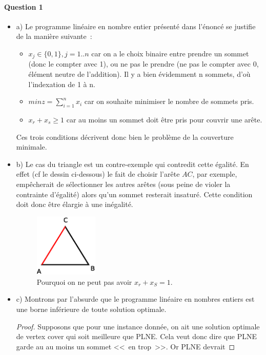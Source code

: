 \paragraph{Question 1}

\begin{itemize}
\item[] a) Le programme linéaire en nombre entier présenté dans
  l'énoncé se justifie de la manière suivante~:
\begin{itemize}
\item $x_j \in \{0,1\}, j=1..n$ car on a le choix binaire entre prendre un
  sommet (donc le compter avec 1), ou ne pas le prendre (ne pas le
  compter avec 0, élément neutre de l'addition). Il y a bien
  évidemment n sommets, d'où l'indexation de 1 à n.
\item $min z = \sum^n _{i=1} x_i$ car on souhaite minimiser le nombre
  de sommets pris.
\item $x_r + x_s \geq 1$ car au moins un sommet doit être pris pour
  couvrir une arête.
\end{itemize}
Ces trois conditions décrivent donc bien le problème de la couverture minimale.
\item[] b) Le cas du triangle est un contre-exemple qui contredit cette
égalité. En effet (cf le dessin ci-dessous) le fait de
choisir l'arête $AC$, par exemple, empêcherait de sélectionner les
autres arêtes (sous peine de violer la contrainte d'égalité) alors
qu'un sommet resterait insaturé. Cette condition doit donc être
élargie à une inégalité.
\begin{figure}[!ht]
\begin{center}
\includegraphics[height=3cm]{../images/triangle.eps}
\end{center}
\caption{Pourquoi on ne peut pas avoir $x_r + x_S = 1$.}
\end{figure}
\item[] c) Montrons par l'absurde que le programme linéaire en nombres
  entiers est une borne inférieure de toute solution optimale.
\begin{proof}
Supposons que pour une instance donnée, on ait une solution optimale
de vertex cover qui soit meilleure que PLNE. Cela veut donc dire que
PLNE garde au au moins un sommet <<~en trop~>>. Or PLNE devrait

\end{proof}
\end{itemize}

